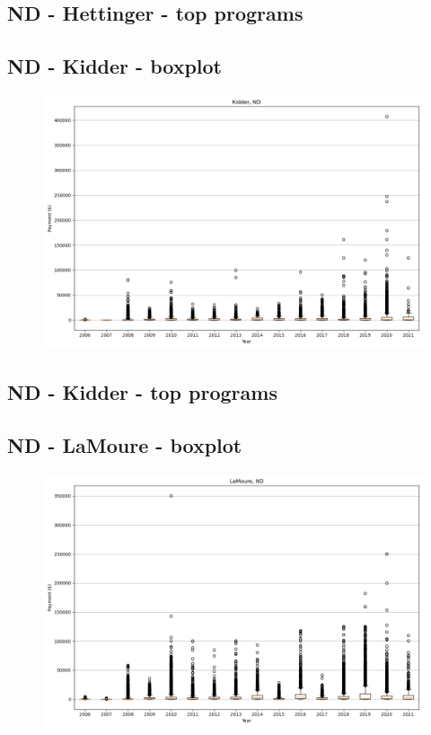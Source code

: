 \subsection*{ND - Hettinger - top programs}

\newpage
\subsection*{ND - Kidder - boxplot}
\begin{figure}[h]
\centering
\includegraphics[width=7in]{../output/boxplots/counties/Kidder-ND_boxplot.png}
\end{figure}


\subsection*{ND - Kidder - top programs}

\newpage
\subsection*{ND - LaMoure - boxplot}
\begin{figure}[h]
\centering
\includegraphics[width=7in]{../output/boxplots/counties/LaMoure-ND_boxplot.png}
\end{figure}


